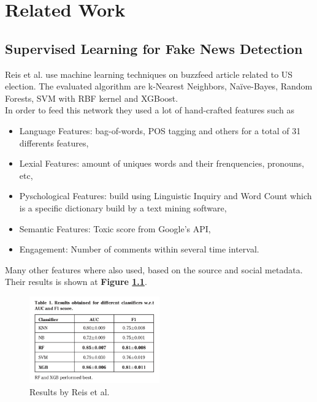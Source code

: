 \chapter{Related Work}
\section{Supervised Learning for Fake News Detection\cite{Reis2019}}
Reis et al. use machine learning techniques on buzzfeed article related to US election. The evaluated algorithm are k-Nearest Neighbors, Na\"ive-Bayes, Random Forests, SVM with RBF kernel and XGBoost. \\

In order to feed this network they used a lot of hand-crafted features such as 
\begin{itemize}
	\item Language Features: bag-of-words, POS tagging and others for a total of 31 differents features,
	\item Lexial Features: amount of uniques words and their frenquencies, pronouns, etc,
	\item Pyschological Features\cite{Pennebaker2001}: build using Linguistic Inquiry and Word Count which is a specific dictionary build by a text mining software,
	\item Semantic Features: Toxic score from Google's API,
	\item Engagement: Number of comments within several time interval.
\end{itemize}

Many other features where also used, based on the source and social metadata. \\

Their results is shown at \textbf{Figure \ref{fig:chap1:reis}}.

\begin{figure}[h]
	\centering
	\includegraphics[width=0.5\textwidth]{images/chap1_bis/rev1.png}
	\caption{Results by Reis et al. }
	\label{fig:chap1:reis}
\end{figure}

